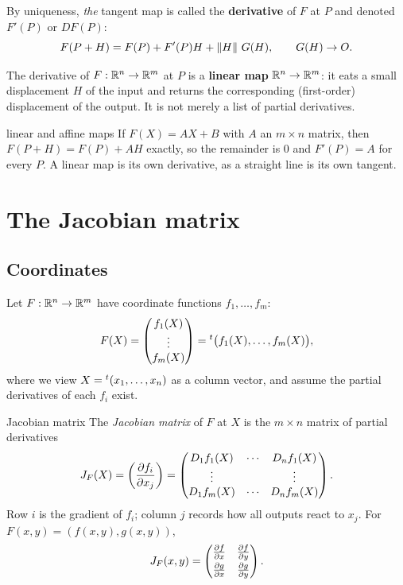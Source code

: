 By uniqueness, \emph{the} tangent map is called the \textbf{derivative} of $F$ at $P$ and denoted
$F'(P)$ or $DF(P)$:
\[ F(P+H)=F(P)+F'(P)H+\left\lVert H\right\rVert\,G(H),\qquad G(H)\to O . \]

\begin{keyidea}
The derivative of $F:\mathbb{R}^n\to\mathbb{R}^m$ at $P$ is a \textbf{linear map} $\mathbb{R}^n\to\mathbb{R}^m$: it eats a small
displacement $H$ of the input and returns the corresponding (first-order) displacement of the
output. It is not merely a list of partial derivatives.
\end{keyidea}

\begin{example}{linear and affine maps}
If $F(X)=AX+B$ with $A$ an $m\times n$ matrix, then $F(P+H)=F(P)+AH$ exactly, so the remainder
is $0$ and $F'(P)=A$ for every $P$. A linear map is its own derivative, as a straight line is its
own tangent.
\end{example}

\section{The Jacobian matrix}

\subsection{Coordinates}

Let $F:\mathbb{R}^n\to\mathbb{R}^m$ have coordinate functions $f_1,\dots,f_m$:
\[ F(X)=\begin{pmatrix}f_1(X)\\ \vdots\\ f_m(X)\end{pmatrix}={}^{t}\big(f_1(X),\dots,f_m(X)\big), \]
where we view $X={}^{t}(x_1,\dots,x_n)$ as a column vector, and assume the partial derivatives of
each $f_i$ exist.

\begin{definition}{Jacobian matrix}
The \emph{Jacobian matrix} of $F$ at $X$ is the $m\times n$ matrix of partial derivatives
\[
J_F(X)=\left(\frac{\partial f_i}{\partial x_j}\right)=\begin{pmatrix}D_1f_1(X)&\cdots&D_nf_1(X)\\ \vdots&&\vdots\\ D_1f_m(X)&\cdots&D_nf_m(X)\end{pmatrix}.
\]
Row $i$ is the gradient of $f_i$; column $j$ records how all outputs react to $x_j$. For
$F(x,y)=(f(x,y),g(x,y))$,
\[ J_F(x,y)=\begin{pmatrix}\frac{\partial f}{\partial x}&\frac{\partial f}{\partial y}\\[3pt] \frac{\partial g}{\partial x}&\frac{\partial g}{\partial y}\end{pmatrix}. \]
\end{definition}

